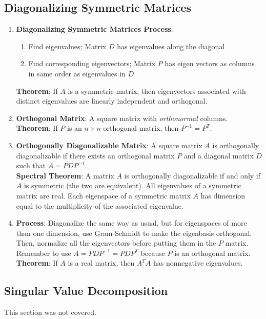 \documentclass[10pt]{article}
\begin{document}
\subsection{Diagonalizing Symmetric Matrices}
\begin{enumerate}
\item \textbf{Diagonalizing Symmetric Matrices Process}:
\begin{enumerate}
\item Find eigenvalues; Matrix $D$ has eigenvalues along the diagonal
\item Find corresponding eigenvectors; Matrix $P$ has eigen vectors as columns in same order as eigenvalues in $D$
\end{enumerate}
\textbf{Theorem}: If $A$ is a symmetric matrix, then eigenvectors associated with distinct eigenvalues are linearly independent and orthogonal.
\item \textbf{Orthogonal Matrix}: A square matrix with \textit{orthonormal} columns. \\
\textbf{Theorem}: If $P$ is an $n \times n$ orthogonal matrix, then $P^{-1} = P^T$.
\item \textbf{Orthogonally Diagonalizable Matrix}: A square matrix $A$ is orthogonally diagonalizable if there exists an orthogonal matrix $P$ and a diagonal matrix $D$ such that $A = PDP^{-1}$. \\
\textbf{Spectral Theorem}: A matrix $A$ is orthogonally diagonalizable if and only if $A$ is symmetric (the two are equivalent). All eigenvalues of a symmetric matrix are real. Each eigenspace of a symmetric matrix $A$ has dimension equal to the multiplicity of the associated eigenvalue.
\item \textbf{Process}: Diagonalize the same way as usual, but for eigenspaces of more than one dimension, use Gram-Schmidt to make the eigenbasis orthogonal. Then, normalize all the eigenvectors before putting them in the $P$ matrix. Remember to use $A = PDP^{-1} = PDP^{T}$ because $P$ is an orthogonal matrix.\\
\textbf{Theorem}: If $A$  is a real matrix, then $A^TA$ has nonnegative eigenvalues.
\end{enumerate}
\subsection{Singular Value Decomposition}
This section was not covered.
\end{document}
